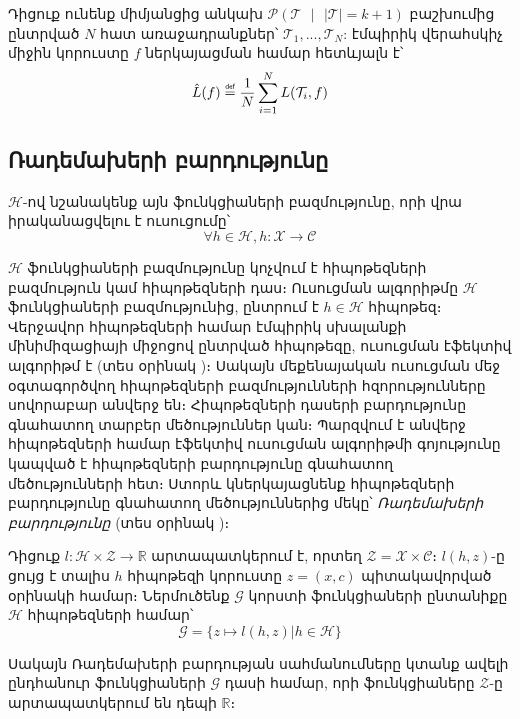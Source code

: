 \documentclass[12pt]{article}
\newcommand\defeq{\mathrel{\overset{\makebox[0pt]{\mbox{\normalfont\tiny\sffamily def}}}{=}}}
\begin{document}
\begin{defination}
Դիցուք ունենք միմյանցից անկախ $\mathcal{P}(\mathcal{T} \text{ } |\text{ }  |\mathcal{T}| = k +1)$ բաշխումից ընտրված $N$ հատ առաջադրանքներ՝ $\mathcal{T}_1, ..., \mathcal{T}_N$:
էմպիրիկ վերահսկիչ միջին կորուստը $f$ ներկայացման համար հետևյալն է՝ 
$$\hat{L}(f) \defeq \frac{1}{N}\sum_{i=1}^{N}L (\mathcal{T}_i, f)$$
\end{defination}
\pagebreak

\subsection*{\hfill Ռադեմախերի բարդությունը \hfill} \noindent

{}

$\mathcal{H}$-ով նշանակենք այն ֆունկցիաների բազմությունը, որի վրա իրականացվելու է ուսուցումը՝
$$\forall h \in \mathcal{H}, h:\mathcal{X} \rightarrow \mathcal{C}$$

\noindent $\mathcal{H}$ ֆունկցիաների բազմությունը կոչվում է հիպոթեզների բազմություն կամ հիպոթեզների դաս։ Ուսուցման ալգորիթմը $\mathcal{H}$ ֆունկցիաների բազմությունից, ընտրում է $h \in \mathcal{H}$ հիպոթեզ։
 Վերջավոր հիպոթեզների համար էմպիրիկ սխալանքի մինիմիզացիայի միջոցով ընտրված հիպոթեզը, ուսուցման էֆեկտիվ ալգորիթմ է (տես օրինակ \cite{bib_item_9, bib_item_10})։ Սակայն մեքենայական ուսուցման մեջ օգտագործվող հիպոթեզների բազմությունների հզորությունները սովորաբար անվերջ են։ 
Հիպոթեզների դասերի բարդությունը գնահատող տարբեր մեծություններ կան։ Պարզվում է անվերջ հիպոթեզների համար էֆեկտիվ ուսուցման ալգորիթմի գոյությունը կապված է հիպոթեզների բարդությունը գնահատող մեծությունների հետ։ Ստորև կներկայացնենք հիպոթեզների բարդությունը գնահատող մեծություններից մեկը՝   \textit{Ռադեմախերի բարդությունը} (տես օրինակ \cite{bib_item_9, bib_item_10})։

\par Դիցուք $l:\mathcal{H}\times \mathcal{Z} \rightarrow \mathbb{R}$ արտապատկերում է, որտեղ $\mathcal{Z} = \mathcal{X} \times \mathcal{C}$։ $l(h, z)$-ը ցույց է տալիս $h$ հիպոթեզի կորուստը $z = (x, c)$  պիտակավորված օրինակի համար։ Ներմուծենք $\mathcal{G}$ կորստի ֆունկցիաների ընտանիքը $\mathcal{H}$ հիպոթեզների համար՝
$$\mathcal{G} = \{z \mapsto l(h, z) | h \in \mathcal{H}\}$$

Սակայն Ռադեմախերի բարդության սահմանումները կտանք ավելի ընդհանուր ֆունկցիաների $\mathcal{G}$ դասի համար, որի ֆունկցիաները $\mathcal{Z}$-ը արտապատկերում են դեպի $\mathbb{R}$։
\end{document}
